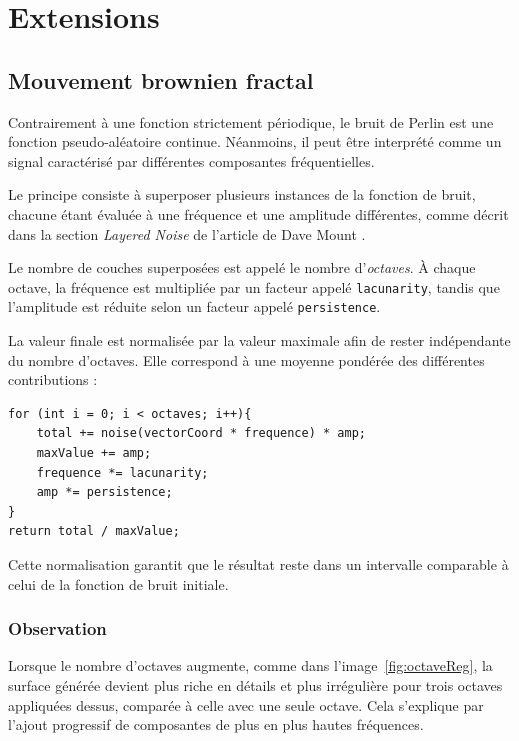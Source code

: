 \section{Extensions}

\subsection{Mouvement brownien fractal}

Contrairement à une fonction strictement périodique, le bruit de Perlin est une fonction pseudo-aléatoire continue.
Néanmoins, il peut être interprété comme un signal caractérisé par différentes composantes fréquentielles.

Le principe consiste à superposer plusieurs instances de la fonction de bruit, chacune étant évaluée à une fréquence et une amplitude différentes, comme décrit dans la section \textit{Layered Noise} de l'article de Dave Mount \cite{Student_Level_Explanation_PerlinNoise}. 

Le nombre de couches superposées est appelé le nombre d’\textit{octaves}. 
À chaque octave, la fréquence est multipliée par un facteur appelé \texttt{lacunarity}, tandis que l’amplitude est réduite selon un facteur appelé \texttt{persistence}.

La valeur finale est normalisée par la valeur maximale afin de rester indépendante du nombre d’octaves.
Elle correspond à une moyenne pondérée des différentes contributions :

\begin{verbatim}
for (int i = 0; i < octaves; i++){
    total += noise(vectorCoord * frequence) * amp;
    maxValue += amp;
    frequence *= lacunarity;
    amp *= persistence;
}
return total / maxValue;
\end{verbatim}

Cette normalisation garantit que le résultat reste dans un intervalle comparable à celui de la fonction de bruit initiale.

\subsubsection{Observation}

Lorsque le nombre d’octaves augmente, comme dans l'image~\ref{fig:octaveReg}, la surface générée devient plus riche en détails et plus irrégulière pour trois octaves appliquées dessus, comparée à celle avec une seule octave.
Cela s’explique par l’ajout progressif de composantes de plus en plus hautes fréquences.

